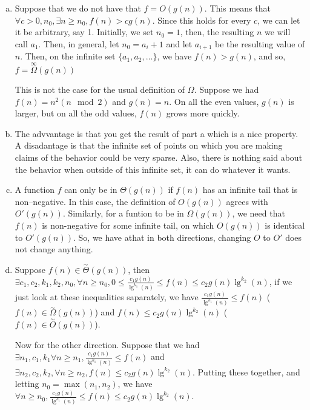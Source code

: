 \documentclass{article}
\begin{document}
\begin{enumerate}[a)]
\item
Suppose that we do not have that $f=O(g(n))$. This means that $\forall c>0,n_0, \exists n\ge n_0, f(n) > c g(n)$. Since this holds for every $c$, we can let it be arbitrary, say 1. Initially, we set $n_0=1$, then, the resulting $n$ we will call $a_1$. Then, in general, let $n_0= a_i+1$ and let $a_{i+1}$ be the resulting value of $n$. Then, on the infinite set $\{a_1,a_2,\ldots\}$, we have $f(n)>g(n)$, and so, $f = \overset{\infty}{\Omega}(g(n))$

This is not the case for the usual definition of $\Omega$. Suppose we had $f(n) = n^2(n\mod 2)$ and $g(n) = n$. On all the even values, $g(n)$ is larger, but on all the odd values, $f(n)$ grows more quickly.

\item
The advvantage is that you get the result of part a which is a nice property. A disadantage is that the infinite set of points on which you are making claims of the behavior could  be very sparse. Also, there is nothing said about the behavior when outside of this infinite set, it can do whatever it wants.

\item
A function $f$ can only be in $\Theta(g(n))$ if $f(n)$ has an infinite tail that is non--negative. In this case, the definition of $O(g(n))$ agrees with $O'(g(n))$. Similarly, for a funtion to be in $\Omega(g(n))$, we need that $f(n)$ is non-negative for some infinite tail, on which $O(g(n))$ is identical to $O'(g(n))$. So, we have athat in both directions, changing $O$ to $O'$ does not change anything.

\item
Suppose $f(n)\in \overset{\sim}{\Theta}(g(n))$, then $\exists c_1,c_2,k_1,k_2,n_0, \forall n\ge n_0, 0\le \frac{c_1 g(n)}{\lg^{k_1}(n)} \le f(n) \le c_2 g(n)\lg^{k_2}(n)$, if we just look at these inequalities saparately, we have $\frac{c_1 g(n)}{\lg^{k_1}(n)} \le f(n)$ ($f(n) \in \overset{\sim}{\Omega}(g(n))$) and $f(n) \le c_2 g(n)\lg^{k_2}(n)$ ($f(n)\in \overset{\sim}{O}(g(n))$).

Now for the other direction. Suppose that we had $\exists n_1, c_1,k_1 \forall n\ge n_1, \frac{c_1 g(n)}{\lg^{k_1}(n)} \le f(n)$ and $\exists n_2,c_2,k_2, \forall n\ge n_2, f(n)\le c_2g(n)\lg^{k_2}(n)$. Putting these together, and letting $n_0 = \max(n_1,n_2)$, we have $\forall n\ge n_0, \frac{c_1 g(n)}{\lg^{k_1}(n)} \le f(n) \le c_2 g(n)\lg^{k_2}(n)$. 


\end{enumerate}
\end{document}
